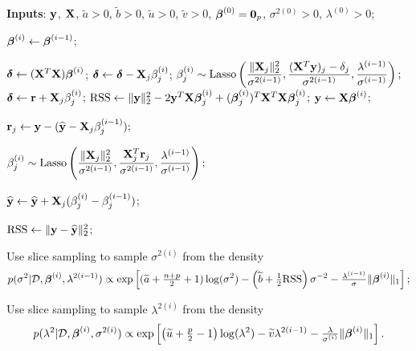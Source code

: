 \begin{algorithm}[!ht]
\caption{Modified Hans Gibbs sampler}\label{B_Gibbs}
\begin{algorithmic}[1]

\State \textbf{Inputs}: ${\bf y}$, ${\bf X}$, $\widetilde{a}>0$, $\widetilde{b}>0$, $\widetilde{u}>0$, $\widetilde{v}>0$, ${\boldsymbol \beta}^{(0)} = {\bf 0}_p$, $\sigma^{2(0)}>0$, $\lambda^{(0)}>0$; 


\State ${\boldsymbol \beta}^{(i)} \leftarrow {\boldsymbol\beta}^{(i-1)}$;





    \State ${\boldsymbol \delta} \leftarrow  ({\bf X}^T{\bf X}) {\boldsymbol \beta}^{(i)}$;
        \State ${\boldsymbol \delta} \leftarrow  {\boldsymbol\delta} - {\bf X}_j \beta_j^{(i)}$;
        \State $\displaystyle \beta^{(i)}_j \sim 
            \text{Lasso}\left( 
                \frac{\| {\bf X}_j\|_2^2}{\sigma^{2(i-1)}}, 
                \frac{({\bf X}^T{\bf y})_j - \delta_j}{\sigma^{2(i-1)}}, 
                \frac{\lambda^{(i-1)}}{\sigma^{(i-1)}} 
            \right);$
        \State ${\boldsymbol \delta} \leftarrow  {\bf r} + {\bf X}_j \beta_j^{(i)}$;
    \EndFor
    \State $\mbox{RSS} \leftarrow  \|{\bf y}\|_2^2 - 2{\bf y}^T{\bf X}{\boldsymbol \beta}_j^{(i)} + ({\boldsymbol \beta}_j^{(i)})^T{\bf X}^T{\bf X}{\boldsymbol \beta}_j^{(i)}$;
\Else 
    \State ${\bf y} \leftarrow {\bf X}{\boldsymbol\beta}^{(i)}$;

\State ${\bf r}_j \leftarrow {\bf y} - (\widehat{{\bf y}} - {\bf X}_{j}\beta^{(i-1)}_j);$

\State $\displaystyle \beta^{(i)}_j \sim 
    \text{Lasso}\left( 
        \frac{\| {\bf X}_j\|_2^2}{\sigma^{2(i-1)}}, 
        \frac{{\bf X}_j^T{\bf r}_j}{\sigma^{2(i-1)}}, 
        \frac{\lambda^{(i-1)}}{\sigma^{(i-1)}} 
    \right);$

\State $\widehat{\bf y} \leftarrow \widehat{\bf y} + {\bf X}_{j}(\beta^{(i)}_j - \beta^{(i-1)}_j) $;
\EndFor

    \State $\mbox{RSS} \leftarrow  \|{\bf y} - \widehat{{\bf y}}\|_2^2$;

\EndIf


\State Use slice sampling to sample $\sigma^{2(i)}$ from the density
$$
\displaystyle p(\sigma^2|{\mathcal D},{\boldsymbol \beta}^{(i)},\lambda^{2(i-1)})      
    \propto \exp\left[
        (\widetilde{a} +\tfrac{n+p}{2} +1)\log(\sigma^{2}) 
        - \left(\widetilde{b} + \tfrac{1}{2}\mbox{RSS}\right)\sigma^{-2} - \tfrac{\lambda^{(i-1)}}{\sigma}\| {\boldsymbol \beta}^{(i)} \|_1 \right];
$$

\State Use slice sampling to sample $\lambda^{2(i)}$ from the density
$$
\displaystyle p(\lambda^{2}|{\mathcal D},{\boldsymbol\beta}^{(i)},\sigma^{2(i)}) 
    \propto \exp\left[
        \left( \widetilde{u} + \tfrac{p}{2} - 1\right) \log(\lambda^{2}) 
        - \widetilde{v}\lambda^{2(i-1)} 
        - \tfrac{\lambda}{\sigma^{(i)}} \| {\boldsymbol \beta}^{(i)} \|_1 \right].
$$

\EndFor
\end{algorithmic}
\end{algorithm}


